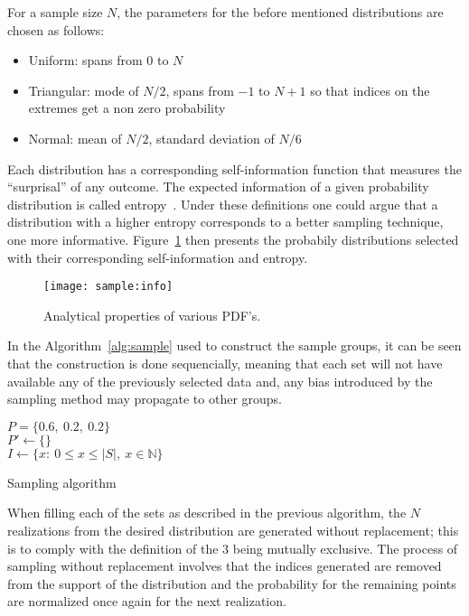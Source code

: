 For a sample size $N$, the parameters for the before mentioned distributions 
are chosen as follows:
\begin{itemize}
    \item Uniform: spans from $0$ to $N$
    \item Triangular: mode of $N/2$, spans from $-1$ to $N+1$ so that indices on
        the extremes get a non zero probability
    \item Normal: mean of $N/2$, standard deviation of $N/6$
\end{itemize} 

Each distribution has a corresponding self-information function that measures
the ``surprisal'' of any outcome. The expected information of a given
probability distribution is called entropy~\cite{information:borda}. Under these
definitions one could argue that a distribution with a higher entropy
corresponds to a better sampling technique, one more informative.
Figure~\ref{fig:sample:info} then presents the probabily distributions selected
with their corresponding self-information and entropy.

\begin{figure}[ht]
    \texttt{[image: sample:info]}
    \caption{Analytical properties of various PDF's. \label{fig:sample:info}}
\end{figure}

In the Algorithm~\ref{alg:sample} used to construct the sample groups, it can be
seen that the construction is done sequencially, meaning that each set will not
have available any of the previously selected data and, any bias introduced by
the sampling method may propagate to other groups.

\begin{algorithm}[ht]
    $P = \{0.6,\ 0.2,\ 0.2\}$\\
    $P' \gets \{\}$\\
    $I \gets \{x:\ 0\leq x\leq \lvert S\rvert,\ x\in\mathbb{N}\}$\\
     \caption{Sampling algorithm\label{alg:sample}}
\end{algorithm}

When filling each of the sets as described in the previous algorithm, the $N$
realizations from the desired distribution are generated without replacement;
this is to comply with the definition of the $3$ being mutually exclusive. The
process of sampling without replacement involves that the indices generated are
removed from the support of the distribution and the probability for the
remaining points are normalized once again for the next realization.

